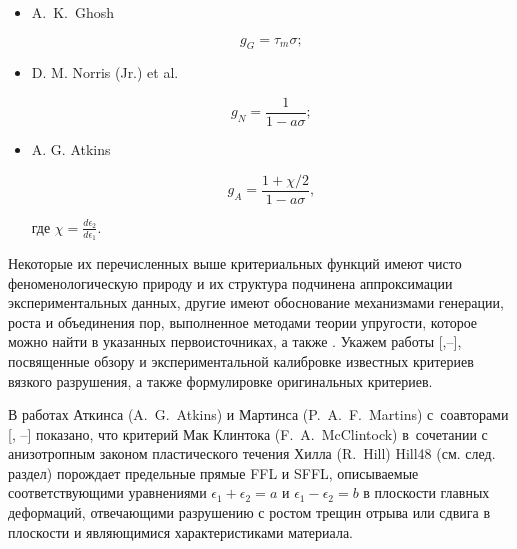 \begin{itemize}
\begin{equation}
\end{equation}



\item[--] 

A.~K.~Ghosh \cite{keller:bib:ghosh}

\begin{equation}

	g_{G}=\tau_m \sigma;

\end{equation}



\item[--] 

D. M. Norris (Jr.) et al. \cite{keller:bib:norris}

\begin{equation}

	g_{N}=\frac{1}{1-a\sigma};

\end{equation}



\item[--] 

A. G. Atkins \cite{keller:bib:atkins}

\begin{equation}

	g_{A}=\frac{1+\chi/2}{1-a\sigma},

\end{equation}

где $\chi=\frac{d\epsilon_2}{d\epsilon_1}.$



\end{itemize}



Некоторые их перечисленных выше критериальных функций имеют чисто феноменологическую природу и их структура подчинена аппроксимации экспериментальных данных, другие имеют обоснование механизмами генерации, роста и объединения пор, выполненное методами теории упругости, которое можно найти в указанных первоисточниках, а также \cite{keller:bib:weck}. Укажем работы [,--], посвященные обзору и экспериментальной калибровке известных критериев вязкого разрушения, а также формулировке оригинальных критериев.



В  работах Аткинса (A.~G.~Atkins) и Мартинса (P.~A.~F.~Martins) с~соавторами [, --] показано, что критерий Мак Клинтока (F.~A.~McClintock) в~сочетании с анизотропным законом пластического течения Хилла (R.~Hill) {\small\sc Hill48} (см. след. раздел) порождает предельные прямые FFL и SFFL, описываемые соответствующими уравнениями $\epsilon_1+\epsilon_2=a$ и $\epsilon_1-\epsilon_2=b$ в плоскости главных деформаций, отвечающими разрушению с ростом трещин отрыва или сдвига в плоскости и являющимися характеристиками материала.



